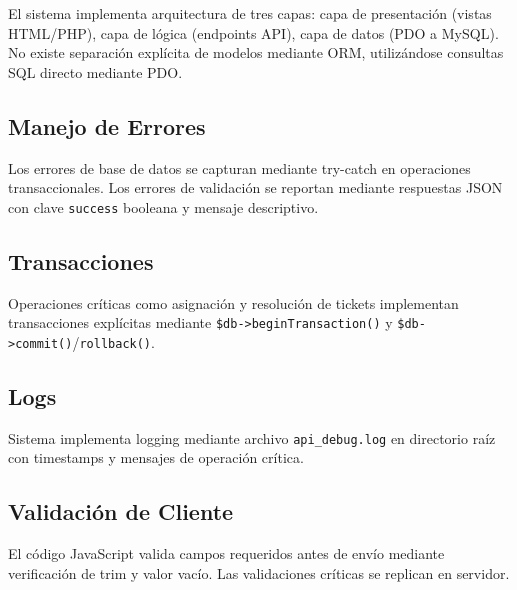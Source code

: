 \documentclass[12pt,a4paper]{article}
\begin{document}
El sistema implementa arquitectura de tres capas: capa de presentación (vistas HTML/PHP), capa de lógica (endpoints API), capa de datos (PDO a MySQL). No existe separación explícita de modelos mediante ORM, utilizándose consultas SQL directo mediante PDO.

\subsection{Manejo de Errores}

Los errores de base de datos se capturan mediante try-catch en operaciones transaccionales. Los errores de validación se reportan mediante respuestas JSON con clave \texttt{success} booleana y mensaje descriptivo.

\subsection{Transacciones}

Operaciones críticas como asignación y resolución de tickets implementan transacciones explícitas mediante \texttt{\$db->beginTransaction()} y \texttt{\$db->commit()}/\texttt{rollback()}.

\subsection{Logs}

Sistema implementa logging mediante archivo \texttt{api\_debug.log} en directorio raíz con timestamps y mensajes de operación crítica.

\subsection{Validación de Cliente}

El código JavaScript valida campos requeridos antes de envío mediante verificación de trim y valor vacío. Las validaciones críticas se replican en servidor.
\end{document}
